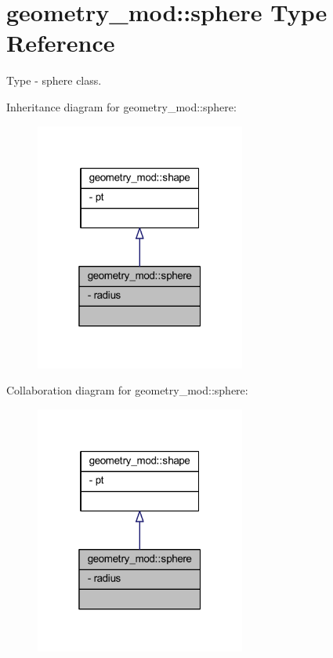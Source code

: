 \hypertarget{structgeometry__mod_1_1sphere}{}\section{geometry\+\_\+mod\+:\+:sphere Type Reference}
\label{structgeometry__mod_1_1sphere}


Type -\/ sphere class.  




Inheritance diagram for geometry\+\_\+mod\+:\+:sphere\+:
\nopagebreak
\begin{figure}[H]
\begin{center}
\leavevmode
\includegraphics[width=196pt]{structgeometry__mod_1_1sphere__inherit__graph}
\end{center}
\end{figure}


Collaboration diagram for geometry\+\_\+mod\+:\+:sphere\+:
\nopagebreak
\begin{figure}[H]
\begin{center}
\leavevmode
\includegraphics[width=196pt]{structgeometry__mod_1_1sphere__coll__graph}
\end{center}
\end{figure}
